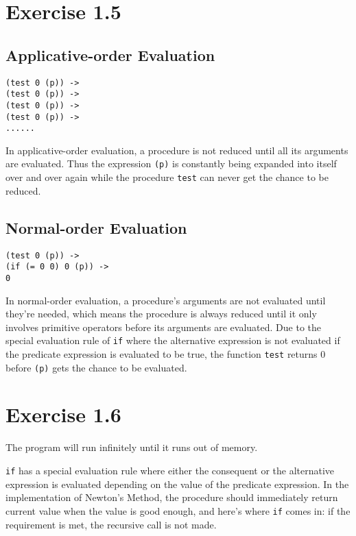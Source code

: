 \documentclass[../main.tex]{subfiles}
\begin{document}
\section{Exercise 1.5}

\subsection*{Applicative-order Evaluation}

\begin{lstlisting}
(test 0 (p)) ->
(test 0 (p)) ->
(test 0 (p)) ->
(test 0 (p)) ->
......
\end{lstlisting}

In applicative-order evaluation, a procedure is not reduced until all its arguments are evaluated. Thus the expression \lstinline{(p)} is constantly being expanded into itself over and over again while the procedure \lstinline{test} can never get the chance to be reduced.

\subsection*{Normal-order Evaluation}

\begin{lstlisting}
(test 0 (p)) ->
(if (= 0 0) 0 (p)) ->
0
\end{lstlisting}

In normal-order evaluation, a procedure's arguments are not evaluated until they're needed, which means the procedure is always reduced until it only involves primitive operators before its arguments are evaluated. Due to the special evaluation rule of \lstinline{if} where the alternative expression is not evaluated if the predicate expression is evaluated to be true, the function \lstinline{test} returns 0 before \lstinline{(p)} gets the chance to be evaluated.

\section{Exercise 1.6}

The program will run infinitely until it runs out of memory.

\lstinline{if} has a special evaluation rule where either the consequent or the alternative expression is evaluated depending on the value of the predicate expression. In the implementation of Newton's Method, the procedure should immediately return current value when the value is good enough, and here's where \lstinline{if} comes in: if the requirement is met, the recursive call is not made.
 
\end{document}
